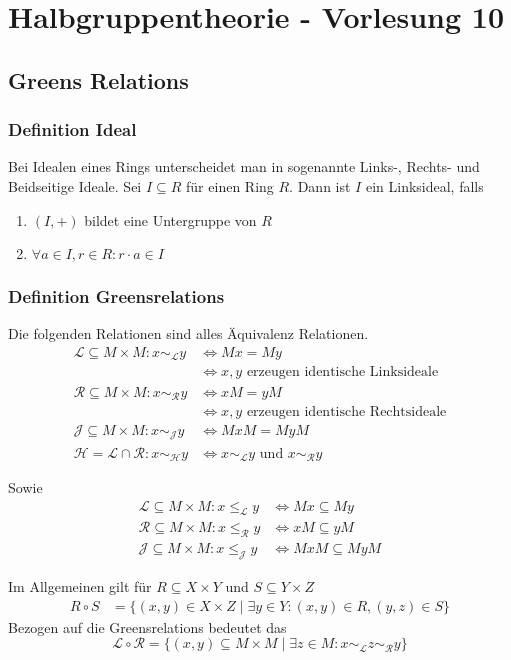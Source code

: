 \documentclass[12pt, german]{article}
\newcommand{\grel}{\sim_{\mathcal{L}}}
\newcommand{\grer}{\sim_{\mathcal{R}}}
\newcommand{\grej}{\sim_{\mathcal{J}}}
\newcommand{\greh}{\sim_{\mathcal{H}}}
\newcommand{\lgreleq}{\leqslant_{\mathcal{L}}}
\newcommand{\lgrereq}{\leqslant_{\mathcal{R}}}
\newcommand{\lgrejeq}{\leqslant_{\mathcal{J}}}
\begin{document}
\section{Halbgruppentheorie - Vorlesung 10}
\subsection{Greens Relations}
\subsubsection{Definition Ideal}
	Bei Idealen eines Rings unterscheidet man in sogenannte Links-, Rechts- und Beidseitige Ideale. 
	Sei $I \subseteq R$ für einen Ring $R$. Dann ist $I$ ein Linksideal, falls 
	\begin{enumerate}[label= \arabic*.)]
		\item $(I, +)$ bildet eine Untergruppe von $R$ 
		\item $\forall a \in I, r \in R : r \cdot a \in I  $
	\end{enumerate}
\subsubsection{Definition Greensrelations}	
	Die folgenden Relationen sind alles Äquivalenz Relationen. 
	\begin{align*}
		\mathcal L \subseteq M \times M: x \grel y &\iff Mx = My \\ 
		&\iff x,y \text{ erzeugen identische Linksideale} \\
		\mathcal R \subseteq M \times M: x \grer y &\iff xM = yM  \\ 
		&\iff x,y \text{ erzeugen identische Rechtsideale} \\
		\mathcal J \subseteq M \times M: x \grej y &\iff MxM = MyM \\ 
		\mathcal H = \mathcal L \cap \mathcal R: x \greh y &\iff x \grel y \text{ und } x \grer y
	\end{align*}
	
	Sowie 
	\begin{align*}
		\mathcal L \subseteq M \times M: x \lgreleq y &\iff Mx \subseteq My \\
		\mathcal R \subseteq M \times M: x \lgrereq y &\iff xM \subseteq yM \\
		\mathcal J \subseteq M \times M: x \lgrejeq y &\iff MxM \subseteq MyM 
	\end{align*}
	
	Im Allgemeinen gilt für $R \subseteq X \times Y$ und $S \subseteq Y \times Z$
	\begin{align*}
		R \circ S &= \{(x,y) \in X \times Z \mid \exists y \in Y: (x,y) \in R, (y, z) \in S\} 
	\end{align*} 
	Bezogen auf die Greensrelations bedeutet das $$\mathcal L \circ \mathcal R = \{ (x,y) \subseteq M \times M \mid \exists z \in M : x \grel z \grer y \}$$
	\newline
	
\end{document}
